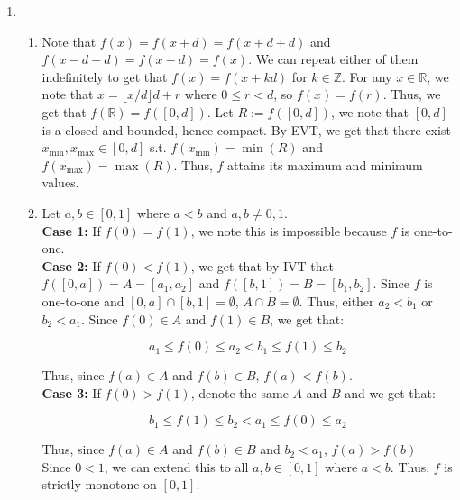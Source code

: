 \documentclass{article}
\begin{document}
\begin{enumerate}
\newpage

\item
\begin{enumerate}
    \item 
    Note that $f(x) = f(x + d) = f(x + d + d)$ and $f(x - d - d) = f(x - d) = f(x)$. We can repeat either of them indefinitely to get that $f(x) = f(x + kd)$ for $k \in \mathbb{Z}$. For any $x \in \mathbb{R}$, we note that $x = \lfloor x / d \rfloor d + r$ where $0 \leq r < d$, so $f(x) = f(r)$. Thus, we get that $f(\mathbb{R}) = f([0, d])$. Let $R := f([0, d])$, we note that $[0, d]$ is a closed and bounded, hence compact. By EVT, we get that there exist $x_{\text{min}}, x_{\text{max}} \in [0, d]$ s.t. $f(x_{\text{min}}) = \min(R)$ and $f(x_{\text{max}}) = \max(R)$. Thus, $f$ attains its maximum and minimum values. 

    \item 
    Let $a, b \in [0, 1]$ where $a < b$ and $a, b \not = 0, 1$. \\

    \textbf{Case 1:} If $f(0) = f(1)$, we note this is impossible because $f$ is one-to-one. \\

    \textbf{Case 2:} If $f(0) < f(1)$, we get that by IVT that $f([0, a]) = A = [a_1, a_2]$ and $f([b, 1]) = B = [b_1, b_2]$. Since $f$ is one-to-one and $[0, a] \cap [b, 1] = \emptyset$, $A \cap B = \emptyset$. Thus, either $a_2 < b_1$ or $b_2 < a_1$. Since $f(0) \in A$ and $f(1) \in B$, we get that:

    $$a_1 \leq f(0) \leq a_2 < b_1 \leq f(1) \leq b_2$$

    Thus, since $f(a) \in A$ and $f(b) \in B$, $f(a) < f(b)$. \\

    \textbf{Case 3:} If $f(0) > f(1)$, denote the same $A$ and $B$ and we get that: 

    $$b_1 \leq f(1) \leq b_2 < a_1 \leq f(0) \leq a_2$$

    Thus, since $f(a) \in A$ and $f(b) \in B$ and $b_2 < a_1$, $f(a) > f(b)$ \\

    Since $0 < 1$, we can extend this to all $a, b \in [0, 1]$ where $a < b$. Thus, $f$ is strictly monotone on $[0, 1]$. 
\end{enumerate}

\end{enumerate}
\end{document}
